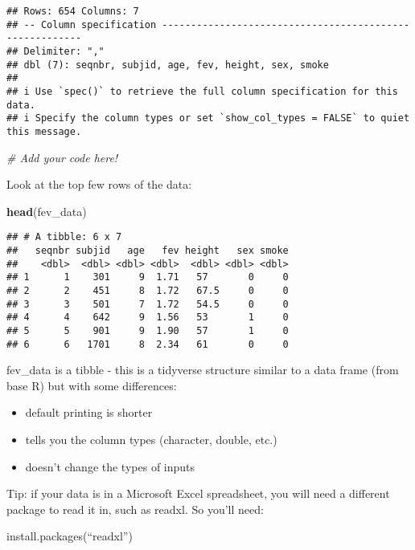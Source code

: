 \documentclass[
]{article}
\newenvironment{Shaded}{\begin{snugshade}}{\end{snugshade}}
\newcommand{\CommentTok}[1]{\textcolor[rgb]{0.56,0.35,0.01}{\textit{#1}}}
\newcommand{\FunctionTok}[1]{\textcolor[rgb]{0.13,0.29,0.53}{\textbf{#1}}}
\newcommand{\NormalTok}[1]{#1}
\providecommand{\tightlist}{%
  \setlength{\itemsep}{0pt}\setlength{\parskip}{0pt}}
\begin{document}
\begin{verbatim}
## Rows: 654 Columns: 7
## -- Column specification --------------------------------------------------------
## Delimiter: ","
## dbl (7): seqnbr, subjid, age, fev, height, sex, smoke
## 
## i Use `spec()` to retrieve the full column specification for this data.
## i Specify the column types or set `show_col_types = FALSE` to quiet this message.
\end{verbatim}

\begin{Shaded}
\begin{Highlighting}[]
\CommentTok{\# Add your code here!}
\end{Highlighting}
\end{Shaded}

Look at the top few rows of the data:

\begin{Shaded}
\begin{Highlighting}[]
\FunctionTok{head}\NormalTok{(fev\_data)}
\end{Highlighting}
\end{Shaded}

\begin{verbatim}
## # A tibble: 6 x 7
##   seqnbr subjid   age   fev height   sex smoke
##    <dbl>  <dbl> <dbl> <dbl>  <dbl> <dbl> <dbl>
## 1      1    301     9  1.71   57       0     0
## 2      2    451     8  1.72   67.5     0     0
## 3      3    501     7  1.72   54.5     0     0
## 4      4    642     9  1.56   53       1     0
## 5      5    901     9  1.90   57       1     0
## 6      6   1701     8  2.34   61       0     0
\end{verbatim}

fev\_data is a tibble - this is a tidyverse structure similar to a data
frame (from base R) but with some differences:

\begin{itemize}
\tightlist
\item
  default printing is shorter
\item
  tells you the column types (character, double, etc.)
\item
  doesn't change the types of inputs
\end{itemize}

Tip: if your data is in a Microsoft Excel spreadsheet, you will need a
different package to read it in, such as readxl. So you'll need:

install.packages(``readxl'')
\end{document}
